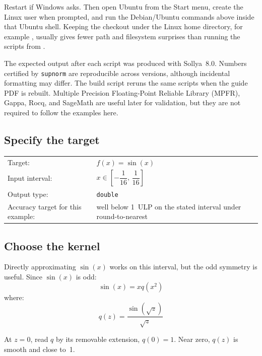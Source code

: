 \documentclass[manuscript, nonacm]{acmart}
\begin{document}
    Restart if Windows asks. Then open Ubuntu from the Start menu, create the
    Linux user when prompted, and run the Debian/Ubuntu commands above inside
    that Ubuntu shell. Keeping the checkout under the Linux home directory, for
    example , usually gives fewer path and filesystem surprises
    than running the scripts from .

    The expected output after each script was produced with Sollya~8.0. Numbers
    certified by \texttt{supnorm} are reproducible across versions, although
    incidental formatting may differ. The build script
     reruns the same scripts when
    the guide PDF is rebuilt. Multiple Precision Floating-Point Reliable Library (MPFR), Gappa, Rocq, and SageMath are useful later for
    validation, but they are not required to follow the examples here.

    \subsection{Specify the target}
    \label{sec:target}

    \begin{center}
        \begin{tabular}{ll}
            Target:                           & $f(x) = \sin(x)$ \\[3pt]
            Input interval:                   & $x \in \left[-\dfrac{1}{16},\, \dfrac{1}{16}\right]$ \\[8pt]
            Output type:                      & \texttt{double} \\[3pt]
            Accuracy target for this example: & well below 1~ULP on the stated interval under round-to-nearest \\
        \end{tabular}
    \end{center}

    \subsection{Choose the kernel}

    Directly approximating $\sin(x)$ works on this interval, but the odd symmetry
    is useful. Since $\sin(x)$ is odd:
    \[
        \sin(x) = x q(x^2)
    \]
    where:
    \[
        q(z) = \frac{\sin(\sqrt{z})}{\sqrt{z}}
    \]

    At $z = 0$, read $q$ by its removable extension, $q(0) = 1$.
    Near zero, $q(z)$ is smooth and close to~1.
\end{document}
